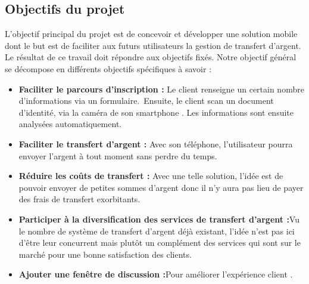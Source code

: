 \subsection{Objectifs du projet}

L’objectif principal du projet est de concevoir et développer une solution mobile dont le but est
de faciliter aux futurs utilisateurs la gestion de transfert d’argent. Le résultat de ce travail doit répondre aux objectifs fixés.
Notre objectif général se décompose en différents objectifs spécifiques à savoir :
\begin{itemize}[label=$\ast$]
	\item \textbf{Faciliter le parcours d'inscription :} Le client renseigne un certain nombre d’informations via un formulaire. Ensuite, le client scan un document d’identité, via la caméra de son smartphone . Les informations sont ensuite analysées automatiquement.
	
	\item \textbf{Faciliter  le transfert d’argent :} Avec son téléphone, l’utilisateur pourra
	envoyer l'argent à tout moment sans perdre du temps.
	
	
	\item \textbf{Réduire  les coûts de transfert :} Avec une telle solution, l’idée est de
	pouvoir envoyer de petites sommes d’argent donc il n’y aura pas lieu de payer des frais de transfert  exorbitants.
	
	
	\item \textbf{Participer à la diversification des services de transfert d’argent :}Vu le nombre de
	système de transfert d’argent déjà existant, l’idée n’est pas ici d’être leur concurrent
	mais plutôt un complément des services qui sont sur le marché pour une bonne
	satisfaction des clients.
	
	
	\item \textbf{Ajouter une fenêtre de discussion  :}Pour améliorer l'expérience client .

\end{itemize}
